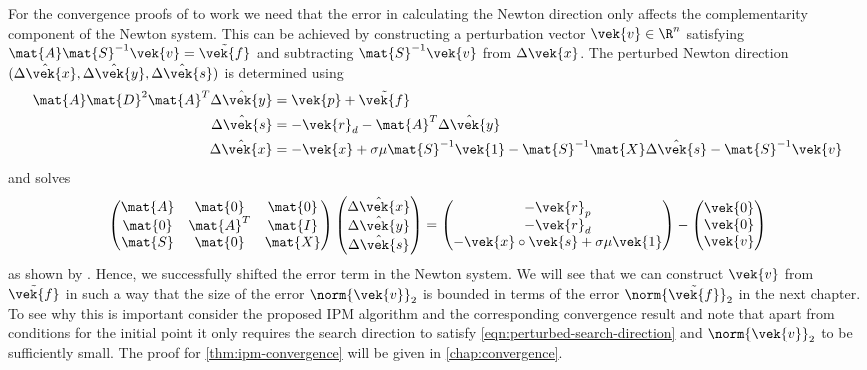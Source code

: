 For the convergence proofs of \textcite{Monteiro-ConvergenceAnalysisLongStepInfeasibleIPMs} to work we need that the error in calculating the Newton direction only affects the complementarity component of the Newton system.
This can be achieved by constructing a perturbation vector \(\vek{v} \in \R^n\) satisfying \(\mat{A}\mat{S}^{-1}\vek{v} = \tilde{\vek{f}}\) and subtracting \(\mat{S}^{-1}\vek{v}\) from \(\Delta\vek{x}\).
The perturbed Newton direction \((\hat{\Delta\vek{x}}, \hat{\Delta\vek{y}}, \hat{\Delta\vek{s}})\) is determined using
\begin{subequations}\label{eqn:perturbed-search-direction-choice}
  \begin{align}
    \mat{A} \mat{D}^2 \mat{A}^T \hat{\Delta\vek{y}} &= \vek{p} + \tilde{\vek{f}} \\
    \hat{\Delta\vek{s}} &= -\vek{r}_d - \mat{A}^T \hat{\Delta\vek{y}} \\
    \hat{\Delta\vek{x}} &= -\vek{x} + \sigma \mu \mat{S}^{-1} \vek{1} - \mat{S}^{-1} \mat{X} \hat{\Delta\vek{s}} - \mat{S}^{-1} \vek{v}
  \end{align}
\end{subequations}
and solves
\begin{equation}\label{eqn:perturbed-search-direction}
  \begin{pmatrix}
    \mat{A} & \mat{0}   & \mat{0} \\
    \mat{0} & \mat{A}^T & \mat{I} \\
    \mat{S} & \mat{0}   & \mat{X} \\
  \end{pmatrix}
  \begin{pmatrix} \hat{\Delta\vek{x}} \\ \hat{\Delta\vek{y}} \\ \hat{\Delta\vek{s}} \end{pmatrix}
  =
  \begin{pmatrix} -\vek{r}_p \\ -\vek{r}_d \\ -\vek{x} \circ \vek{s} + \sigma \mu \vek{1} \end{pmatrix}
  -
  \begin{pmatrix} \vek{0} \\ \vek{0} \\ \vek{v} \end{pmatrix}
\end{equation}
as shown by \textcite[p. 10]{Monteiro-ConvergenceAnalysisLongStepInfeasibleIPMs}.
Hence, we successfully shifted the error term in the Newton system.
We will see that we can construct \(\vek{v}\) from \(\tilde{\vek{f}}\) in such a way that the size of the error \(\norm{\vek{v}}_2\) is bounded in terms of the error \(\norm{\tilde{\vek{f}}}_2\) in the next chapter.
To see why this is important consider the proposed IPM algorithm and the corresponding convergence result
and note that apart from conditions for the initial point it only requires the search direction to satisfy \cref{eqn:perturbed-search-direction} and \(\norm{\vek{v}}_2\) to be sufficiently small.
The proof for \cref{thm:ipm-convergence} will be given in \cref{chap:convergence}.

